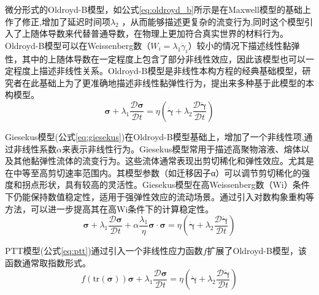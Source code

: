 微分形式的Oldroyd-B模型，如公式\eqref{eq:oldroyd_b}所示是在Maxwell模型的基础上作了修正,增加了延迟时间项$\lambda_2$ ，从而能够描述更复杂的流变行为,同时这个模型引入了上随体导数来代替普通导数，在物理上更加符合真实世界的材料行为\cite{oldroyd1958non}。Oldroyd-B模型可以在Weissenberg数（$W_i=\lambda_1 \dot{\gamma}_i$）较小的情况下描述线性黏弹性，其中的上随体导数在一定程度上包含了部分非线性效应，因此该模型也可以一定程度上描述非线性关系。Oldroyd-B模型是非线性本构方程的经典基础模型，研究者在此基础上为了更准确地描述非线性黏弹性行为，提出来多种基于此模型的本构模型。
\begin{equation}
  \boldsymbol{\sigma} + \lambda_1 \frac{\mathcal{D}\boldsymbol{\sigma}}{\mathcal{D}t} = \eta \left( \dot{\boldsymbol{\gamma}} + \lambda_2 \frac{\mathcal{D}\dot{\boldsymbol{\gamma}}}{\mathcal{D}t} \right) \label{eq:oldroyd_b}
\end{equation}

Giesekus模型(公式\eqref{eq:giesekus})在Oldroyd-B模型基础上，增加了一个非线性项,通过非线性系数$\alpha$来表示非线性行为\cite{giesekus1982simple}。Giesekus模型常用于描述高聚物溶液、熔体以及其他黏弹性流体的流变行为。这些流体通常表现出剪切稀化和弹性效应。尤其是在中等至高剪切速率范围内。其模型参数（如迁移因子α）可以调节剪切稀化的强度和拐点形状，具有较高的灵活性\cite{PENG2021104571,kim2024viscosity}。Giesekus模型在高Weissenberg数（Wi）条件下仍能保持数值稳定性，适用于强弹性效应的流动场景。通过引入对数构象重构等方法，可以进一步提高其在高Wi条件下的计算稳定性\cite{fattal2004constitutive}。
\begin{equation}
  \boldsymbol{\sigma} + \lambda_1 \frac{\mathcal{D}\boldsymbol{\sigma}}{\mathcal{D}t} + \alpha \frac{\lambda_1}{\eta} \boldsymbol{\sigma} \cdot \boldsymbol{\sigma} = \eta \left( \dot{\boldsymbol{\gamma}} + \lambda_2 \frac{\mathcal{D}\dot{\boldsymbol{\gamma}}}{\mathcal{D}t} \right) \label{eq:giesekus}
\end{equation}

PTT模型(公式\eqref{eq:ptt})通过引入一个非线性应力函数$f$扩展了Oldroyd-B模型，该函数通常取指数形式\cite{thien1977new}。
\begin{equation}
  f(\text{tr}(\boldsymbol{\sigma})) \boldsymbol{\sigma} + \lambda_1 \frac{\mathcal{D}\boldsymbol{\sigma}}{\mathcal{D}t} = \eta \left( \dot{\boldsymbol{\gamma}} + \lambda_2 \frac{\mathcal{D}\dot{\boldsymbol{\gamma}}}{\mathcal{D}t} \right) \label{eq:ptt}
\end{equation}

